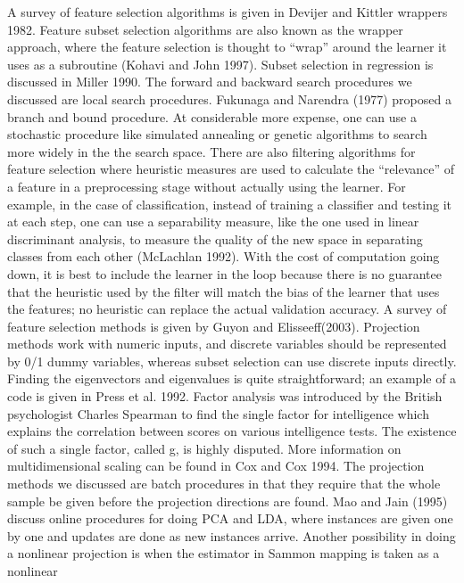 A survey of feature selection algorithms is given in Devijer and Kittler wrappers 1982. Feature subset selection algorithms are also known as the wrapper approach, where the feature selection is thought to “wrap” around the learner it uses as a subroutine (Kohavi and John 1997). Subset selection in regression is discussed in Miller 1990. The forward and backward search procedures we discussed are local search procedures. Fukunaga and Narendra (1977) proposed a branch and bound procedure. At considerable more expense, one can use a stochastic procedure like simulated annealing or genetic algorithms to search more widely in the the search space. There are also filtering algorithms for feature selection where heuristic measures are used to calculate the “relevance” of a feature in a preprocessing stage without actually using the learner. For example, in the case of classification, instead of training a classifier and testing it at each step, one can use a separability measure, like the one used in linear discriminant analysis, to measure the quality of the new space in separating classes from each other (McLachlan 1992). With the cost of computation going down, it is best to include the learner in the loop because there is no guarantee that the heuristic used by the filter will match the bias of the learner that uses the features; no heuristic can replace the actual validation accuracy. A survey of feature selection methods is given by Guyon and Elisseeff(2003). Projection methods work with numeric inputs, and discrete variables should be represented by 0/1 dummy variables, whereas subset selection can use discrete inputs directly. Finding the eigenvectors and eigenvalues is quite straightforward; an example of a code is given in Press et al. 1992. Factor analysis was introduced by the British psychologist Charles Spearman to find the single factor for intelligence which explains the correlation between scores on various intelligence tests. The existence of such a single factor, called g, is highly disputed. More information on multidimensional scaling can be found in Cox and Cox 1994. The projection methods we discussed are batch procedures in that they require that the whole sample be given before the projection directions are found. Mao and Jain (1995) discuss online procedures for doing PCA and LDA, where instances are given one by one and updates are done as new instances arrive. Another possibility in doing a nonlinear projection is when the estimator in Sammon mapping is taken as a nonlinear

